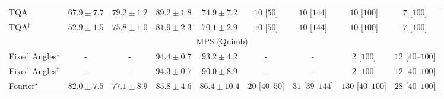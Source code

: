 \begin{tabular}{l|cccc|cccc|}
TQA & {\cellcolor[HTML]{A3BFDC}} \color[HTML]{000000} $67.9\pm 7.7$ & {\cellcolor[HTML]{8C6CB1}} \color[HTML]{F1F1F1} $79.2\pm 1.2$ & {\cellcolor[HTML]{821580}} \color[HTML]{F1F1F1} $89.2\pm 1.8$ & {\cellcolor[HTML]{8C8FC2}} \color[HTML]{F1F1F1} $74.9\pm 7.2$ & {\cellcolor[HTML]{FFF6F2}} \color[HTML]{000000} $10$ [$50$] & {\cellcolor[HTML]{FFF6F2}} \color[HTML]{000000} $10$ [$144$] & {\cellcolor[HTML]{FFF6F2}} \color[HTML]{000000} $10$ [$100$] & {\cellcolor[HTML]{FFF6F2}} \color[HTML]{000000} $7$ [$100$] \\
TQA$^\dagger$ & {\cellcolor[HTML]{F6FBFD}} \color[HTML]{000000} $52.9\pm 1.5$ & {\cellcolor[HTML]{8C88BF}} \color[HTML]{F1F1F1} $75.8\pm 1.0$ & {\cellcolor[HTML]{8A56A7}} \color[HTML]{F1F1F1} $81.9\pm 2.3$ & {\cellcolor[HTML]{99B2D5}} \color[HTML]{000000} $70.1\pm 2.9$ & {\cellcolor[HTML]{FFF6F2}} \color[HTML]{000000} $10$ [$50$] & {\cellcolor[HTML]{FFF6F2}} \color[HTML]{000000} $10$ [$144$] & {\cellcolor[HTML]{FFF6F2}} \color[HTML]{000000} $10$ [$100$] & {\cellcolor[HTML]{FFF6F2}} \color[HTML]{000000} $7$ [$100$] \\
\cline{1-9}
\multicolumn{9}{c}{\rule{0pt}{8pt}MPS (Quimb)} \\
\midrule
Fixed Angles$^\star$ & {\cellcolor[HTML]{000000}} \color[HTML]{F1F1F1} {\cellcolor{white}} \color{black} - & {\cellcolor[HTML]{000000}} \color[HTML]{F1F1F1} {\cellcolor{white}} \color{black} - & {\cellcolor[HTML]{6E2706}} \color[HTML]{F1F1F1} $94.4\pm 0.7$ & {\cellcolor[HTML]{792B05}} \color[HTML]{F1F1F1} $93.2\pm 4.2$ & {\cellcolor[HTML]{000000}} \color[HTML]{F1F1F1} {\cellcolor{white}} \color{black} - & {\cellcolor[HTML]{000000}} \color[HTML]{F1F1F1} {\cellcolor{white}} \color{black} - & {\cellcolor[HTML]{FFF7F3}} \color[HTML]{000000} $2$ [$100$] & {\cellcolor[HTML]{FFF5F1}} \color[HTML]{000000} $12$ [$40$--$100$] \\
Fixed Angles$^\dagger$ & {\cellcolor[HTML]{000000}} \color[HTML]{F1F1F1} {\cellcolor{white}} \color{black} - & {\cellcolor[HTML]{000000}} \color[HTML]{F1F1F1} {\cellcolor{white}} \color{black} - & {\cellcolor[HTML]{702806}} \color[HTML]{F1F1F1} $94.3\pm 0.7$ & {\cellcolor[HTML]{983404}} \color[HTML]{F1F1F1} $90.0\pm 8.9$ & {\cellcolor[HTML]{000000}} \color[HTML]{F1F1F1} {\cellcolor{white}} \color{black} - & {\cellcolor[HTML]{000000}} \color[HTML]{F1F1F1} {\cellcolor{white}} \color{black} - & {\cellcolor[HTML]{FFF7F3}} \color[HTML]{000000} $2$ [$100$] & {\cellcolor[HTML]{FFF5F1}} \color[HTML]{000000} $12$ [$40$--$100$] \\
Fourier$^\star$ & {\cellcolor[HTML]{DB5D0B}} \color[HTML]{F1F1F1} $82.0\pm 7.5$ & {\cellcolor[HTML]{F4811D}} \color[HTML]{F1F1F1} $77.1\pm 8.9$ & {\cellcolor[HTML]{C14702}} \color[HTML]{F1F1F1} $85.8\pm 4.6$ & {\cellcolor[HTML]{BB4403}} \color[HTML]{F1F1F1} $86.4\pm 10.4$ & {\cellcolor[HTML]{FFF3F0}} \color[HTML]{000000} $20$ [$40$--$50$] & {\cellcolor[HTML]{FEF1ED}} \color[HTML]{000000} $31$ [$39$--$144$] & {\cellcolor[HTML]{FDD8D5}} \color[HTML]{000000} $130$ [$40$--$100$] & {\cellcolor[HTML]{FEF1ED}} \color[HTML]{000000} $28$ [$40$--$100$] \\

\end{tabular}
